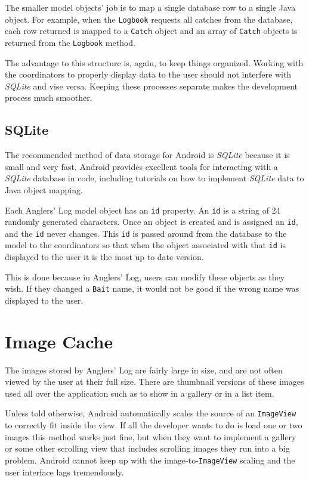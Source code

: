 \documentclass{article}
\begin{document}
	The smaller model objects' job is to map a single database row to a single Java object.  For example, when the \texttt{Logbook} requests all catches from the database, each row returned is mapped to a \texttt{Catch} object and an array of \texttt{Catch} objects is returned from the \texttt{Logbook} method.

	The advantage to this structure is, again, to keep things organized.  Working with the coordinators to properly display data to the user should not interfere with \textit{SQLite} and vise versa. Keeping these processes separate makes the development process much smoother.
	

	\subsection{SQLite}
	
	The recommended method of data storage for Android is \textit{SQLite} because it is small and very fast.  Android provides excellent tools for interacting with a \textit{SQLite} database in code, including tutorials on how to implement \textit{SQLite} data to Java object mapping.

	Each Anglers' Log model object has an \texttt{id} property.  An \texttt{id} is a string of 24 randomly generated characters.  Once an object is created and is assigned an \texttt{id}, and the \texttt{id} never changes.  This \texttt{id} is passed around from the database to the model to the coordinators so that when the object associated with that \texttt{id} is displayed to the user it is the most up to date version.
	
	This is done because in Anglers' Log, users can modify these objects as they wish.  If they changed a \texttt{Bait} name, it would not be good if the wrong name was displayed to the user.
	

	\section{Image Cache}
	
	The images stored by Anglers' Log are fairly large in size, and are not often viewed by the user at their full size.  There are thumbnail versions of these images used all over the application such as to show in a gallery or in a list item.

	Unless told otherwise, Android automatically scales the source of an \texttt{ImageView} to correctly fit inside the view.  If all the developer wants to do is load one or two images this method works just fine, but when they want to implement a gallery or some other scrolling view that includes scrolling images they run into a big problem.  Android cannot keep up with the image-to-\texttt{ImageView} scaling and the user interface lags tremendously.  
\end{document}
